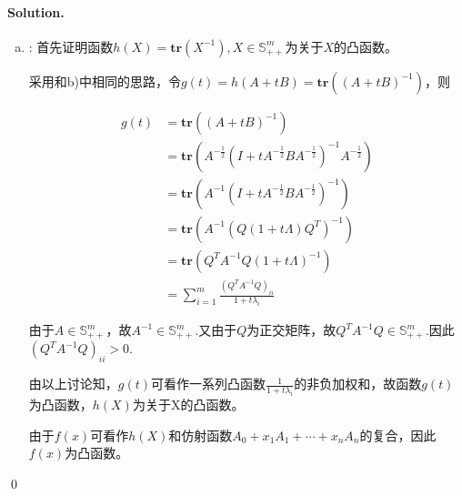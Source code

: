 \documentclass[a4paper]{article}
\newenvironment{solution}
{\color{blue} \paragraph{Solution.}}
{\newline \qed}
\begin{document}
\begin{solution}
\begin{enumerate}[a)]
        \item : 首先证明函数$h(X)=\mathbf{tr}(X^{-1}), X\in \mathbb{S}_{++}^{m}$为关于$X$的凸函数。
        
                采用和b)中相同的思路，令$g(t)=h(A+tB)=\mathbf{tr}((A+tB)^{-1})$，则

                \begin{equation}
                \begin{aligned}
                    g(t)&=\mathbf{tr}((A+tB)^{-1})\\
                    &=\mathbf{tr}(A^{-\frac 12}(I+tA^{-\frac 12}BA^{-\frac 12})^{-1}A^{-\frac 12})\\
                    &=\mathbf{tr}(A^{-1}(I+tA^{-\frac 12}BA^{-\frac 12})^{-1})\\
                    &=\mathbf{tr}(A^{-1}(Q(1+t\Lambda) Q^T)^{-1})\\
                    &=\mathbf{tr}(Q^TA^{-1}Q(1+t\Lambda)^{-1})\\
                    &=\sum_{i=1}^{m}\frac{(Q^TA^{-1}Q)_{ii}}{1+t\lambda_i}
                \end{aligned}
                \end{equation}
                
                由于$A\in\mathbb{S}_{++}^{m}$，故$A^{-1}\in\mathbb{S}_{++}^{m}$.又由于$Q$为正交矩阵，故$Q^TA^{-1}Q\in\mathbb{S}_{++}^{m}$.因此$(Q^TA^{-1}Q)_{ii}>0$.

                由以上讨论知，$g(t)$可看作一系列凸函数$\frac 1{1+t\lambda_i}$的非负加权和，故函数$g(t)$为凸函数，$h(X)$为关于X的凸函数。

                由于$f(x)$可看作$h(X)$和仿射函数$A_0+x_1A_1+\cdots+x_nA_n$的复合，因此$f(x)$为凸函数。

    \end{enumerate}
\end{solution}
\end{document}
